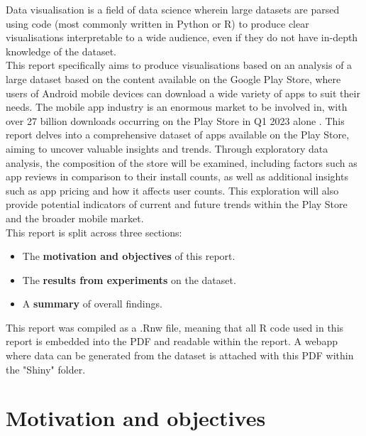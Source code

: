 \documentclass[12pt]{report}\usepackage[]{graphicx}\usepackage[]{xcolor}
\begin{document}
Data visualisation is a field of data science wherein large datasets are parsed
using code (most commonly written in Python or R) to produce clear visualisations
interpretable to a wide audience, even if they do not have in-depth knowledge
of the dataset. \\

\noindent This report specifically aims to produce visualisations based on an
analysis of a large dataset based on the content available on the Google Play Store, 
where users of Android mobile devices can download a wide variety of apps to suit their needs. 
The mobile app industry is an enormous market to be involved in, with over 27 billion 
downloads occurring on the Play Store in Q1 2023 alone \autocite{PlayStoreDLs}. This report delves 
into a comprehensive dataset of apps available on the Play Store, aiming to uncover valuable insights 
and trends. Through exploratory data analysis, the composition of the store will 
be examined, including factors such as app reviews in comparison to their install counts, as well as 
additional insights such as app pricing and how it affects user counts.
This exploration will also provide potential indicators of current and future trends within the Play Store
and the broader mobile market.\\



\noindent This report is split across three sections:
\begin{itemize}
    \item The \textbf{motivation and objectives} of this report.
    \item The \textbf{results from experiments} on the dataset.
    \item A \textbf{summary} of overall findings.
\end{itemize}

\noindent This report was compiled as a .Rnw file, meaning that all R code used in this
report is embedded into the PDF and readable within the report. A webapp where data can 
be generated from the dataset is attached with this PDF within the "Shiny" folder.

\pagebreak

\chapter{Motivation and objectives}

\end{document}
